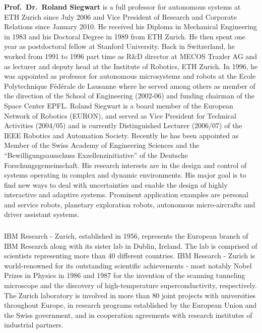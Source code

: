  {\bf Prof.~Dr.~Roland Siegwart} is a full professor for autonomous systems at ETH Zurich since July 2006 and Vice President of Research and Corporate Relations since January 2010. He received his Diploma in Mechanical Engineering in 1983 and his Doctoral Degree in 1989 from ETH Zurich. He then spent one year as postdoctoral fellow at Stanford University. Back in Switzerland, he worked from 1991 to 1996 part time as R\&D director at MECOS Traxler AG and as lecturer and deputy head at the Institute of Robotics, ETH Zurich. In 1996, he was appointed as professor for autonomous microsystems and robots at the Ecole Polytechnique F\'ed\'erale de Lausanne where he served among others as member of the direction of the School of Engineering (2002-06) and funding chairman of the Space Center EPFL. Roland Siegwart is a board member of the European Network of Robotics (EURON), and served as Vice President for Technical Activities (2004/05) and is currently Distinguished Lecturer (2006/07) of the IEEE Robotics and Automation
Society. Recently he has been appointed as Member of the Swiss Academy of Engineering Sciences and the ``Bewilligungsausschuss Exzellenzinitiative'' of the Deutsche Forschungsgemeinschaft. His research interests are in the design and control of systems operating in complex and dynamic environments. His major goal is to find new ways to deal with uncertainties and enable the design of highly interactive and adaptive systems. Prominent application examples are personal and service robots, planetary exploration robots, autonomous micro-aircrafts and driver assistant systems.


\subsubsection{\IBM}

IBM Research - Zurich, established in 1956, represents the European branch of IBM Research along with its sister lab in Dublin, Ireland. The lab is comprised of scientists representing more than 40 different countries. IBM Research - Zurich is world-renowned for its outstanding scientific achievements - most notably Nobel Prizes in Physics in 1986 and 1987 for the invention of the scanning tunneling microscope and the discovery of high-temperature superconductivity, respectively. The Zurich laboratory is involved in more than 80 joint projects with universities throughout Europe, in research programs established by the European Union and the Swiss government, and in cooperation agreements with research institutes of industrial partners.

